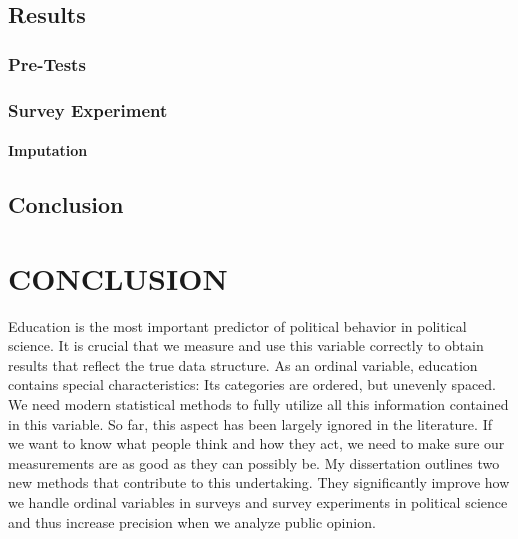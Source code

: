 \documentclass[12pt,econ]{sources/authesis}
\begin{document}
\hypertarget{framing-results}{%
\section{Results}\label{framing-results}}

\hypertarget{framing-results-pre-tests}{%
\subsection{Pre-Tests}\label{framing-results-pre-tests}}

\hypertarget{framing-results-experiment}{%
\subsection{Survey Experiment}\label{framing-results-experiment}}

\hypertarget{framing-results-experiment-imputation}{%
\subsubsection{Imputation}\label{framing-results-experiment-imputation}}

\hypertarget{framing-conclusion}{%
\section{Conclusion}\label{framing-conclusion}}

\hypertarget{conclusion}{%
\chapter{CONCLUSION}\label{conclusion}}

Education is the most important predictor of political behavior in political science. It is crucial that we measure and use this variable correctly to obtain results that reflect the true data structure. As an ordinal variable, education contains special characteristics: Its categories are ordered, but unevenly spaced. We need modern statistical methods to fully utilize all this information contained in this variable. So far, this aspect has been largely ignored in the literature. If we want to know what people think and how they act, we need to make sure our measurements are as good as they can possibly be. My dissertation outlines two new methods that contribute to this undertaking. They significantly improve how we handle ordinal variables in surveys and survey experiments in political science and thus increase precision when we analyze public opinion.
\end{document}
